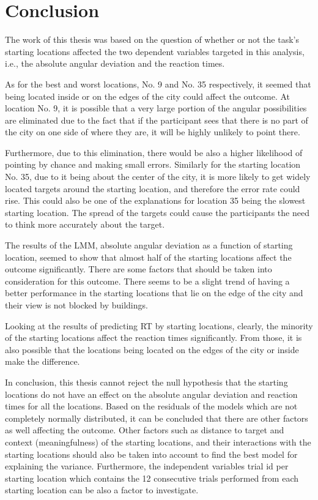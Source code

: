 \chapter{Conclusion}

The work of this thesis was based on the question of whether or not the task's starting locations affected the two dependent variables targeted in this analysis, i.e., the absolute angular deviation and the reaction times.

As for the best and worst locations, No. 9 and No. 35 respectively, it seemed that being located inside or on the edges of the city could affect the outcome. At location No. 9, it is possible that a very large portion of the angular possibilities are eliminated due to the fact that if the participant sees that there is no part of the city on one side of where they are, it will be highly unlikely to point there.

Furthermore, due to this elimination, there would be also a higher likelihood of pointing by chance and making small errors. Similarly for the starting location No. 35, due to it being about the center of the city, it is more likely to get widely located targets around the starting location, and therefore the error rate could rise. This could also be one of the explanations for location 35 being the slowest starting location. The spread of the targets could cause the participants the need to think more accurately about the target. 

The results of the LMM, absolute angular deviation as a function of starting location, seemed to show that almost half of the starting locations affect the outcome significantly. There are some factors that should be taken into consideration for this outcome. There seems to be a slight trend of having a better performance in the starting locations that lie on the edge of the city and their view is not blocked by buildings.

Looking at the results of predicting RT by starting locations, clearly, the minority of the starting locations affect the reaction times significantly. From those, it is also possible that the locations being located on the edges of the city or inside make the difference. 

In conclusion, this thesis cannot reject the null hypothesis that the starting locations do not have an effect on the absolute angular deviation and reaction times for all the locations. Based on the residuals of the models which are not completely normally distributed, it can be concluded that there are other factors as well affecting the outcome. Other factors such as distance to target and context (meaningfulness) of the starting locations, and their interactions with the starting locations should also be taken into account to find the best model for explaining the variance. Furthermore, the independent variables trial id per starting location which contains the 12 consecutive trials performed from each starting location can be also a factor to investigate.

